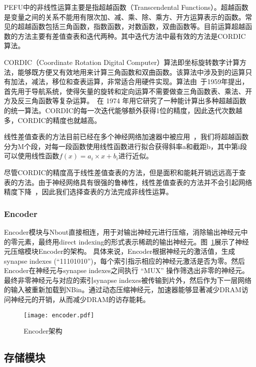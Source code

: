 PEFU中的非线性运算主要是指超越函数（Transcendental Functions）。超越函数是变量之间的关系不能用有限次加、减、乘、除、乘方、开方运算表示的函数。常见的超越函数包括三角函数，指数函数，对数函数，双曲函数等。目前运算超越函数的方法主要有差值查表和迭代两种。其中迭代方法中最有效的方法是CORDIC算法。

CORDIC（Coordinate Rotation Digital Computer）算法即坐标旋转数字计算方法，能够既方便又有效地用来计算三角函数和双曲函数。该算法中涉及到的运算只有加法，减法，移位和查表运算，非常适合用硬件实现。算法由~\citet{Volder1959The}于1959年提出，首先用于导航系统，使得矢量的旋转和定向运算不需要做查三角函数表、乘法、开方及反三角函数等复杂运算。~\citet{Walther1971A}在 1974 年用它研究了一种能计算出多种超越函数的统一算法。CORDIC的每一次迭代能够额外获得1位的精度，因此迭代次数越多，CORDIC的精度也就越高。

线性差值查表的方法目前已经在多个神经网络加速器中被应用~\cite{Temam2012A, chen2014diannao}，我们将超越函数分为M个段，对每一段函数使用线性函数进行拟合获得斜率a和截距b，其中第i段可以使用线性函数$f(x) = a_i \times x + b_i$进行近似。

尽管CORDIC的精度高于线性差值查表的方法，但是面积和能耗开销远远高于查表的方法。由于神经网络具有很强的鲁棒性，线性差值查表的方法并不会引起网络精度下降~\cite{Temam2012A}，因此我们选择查表的方法完成非线性运算。



\subsubsection{Encoder}
Encoder模块与Nbout直接相连，用于对输出神经元进行压缩，消除输出神经元中的零元素，最终用direct indexing的形式表示稀疏的输出神经元。图~\ref{fig:encoder}展示了神经元压缩模块Encoder的架构。
具体来说，Encoder根据神经元的激活值，生成synapse indexes (“11101010”)，每个索引指示相应的神经元激活是否为零。然后Encoder在神经元与synapse indexes之间执行 “MUX” 操作筛选出非零的神经元。最终非零神经元与对应的索引synapse indexes被传输到片外，然后作为下一层网络的输入被重新加载到NBin。通过动态压缩神经元，加速器能够显著减少DRAM访问神经元的开销，从而减少DRAM的访存能耗。

\begin{figure}[h]
\centering
\texttt{[image: encoder.pdf]}
\caption{Encoder架构}
\label{fig:encoder}
\end{figure}

\subsection{存储模块}
\label{subsec:storage}

